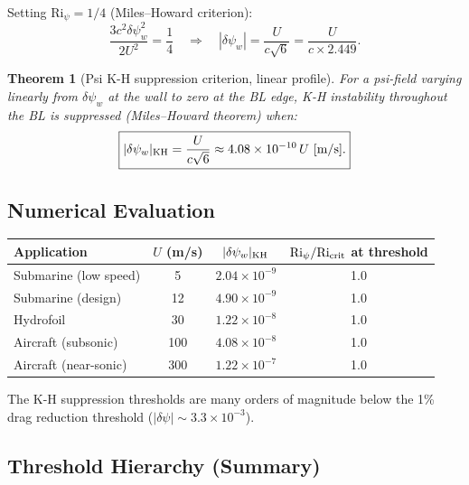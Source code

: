\documentclass[11pt,twocolumn]{article}
\newcommand{\dpsi}{\delta\psi}
\newcommand{\Ri}{\mathrm{Ri}}
\newtheorem{theorem}{Theorem}
\begin{document}
Setting $\Ri_\psi = 1/4$ (Miles--Howard criterion):
\begin{equation}
\frac{3c^2\dpsi_w^2}{2U^2} = \frac{1}{4}
\quad\Rightarrow\quad
|\dpsi_w| = \frac{U}{c\sqrt{6}} = \frac{U}{c\times 2.449}.
\label{eq:KH_threshold}
\end{equation}

\begin{theorem}[Psi K-H suppression criterion, linear profile]
\label{thm:KH}
For a psi-field varying linearly from $\dpsi_w$ at the wall to zero at the
BL edge, K-H instability throughout the BL is suppressed (Miles--Howard
theorem) when:
\begin{equation}
\boxed{
|\dpsi_w|_{\rm KH} = \frac{U}{c\sqrt{6}} \approx 4.08\times10^{-10}\,U~[\text{m/s}].
}
\label{eq:KH_boxed}
\end{equation}
\end{theorem}

\subsection{Numerical Evaluation}

\begin{center}
\begin{tabular}{@{}lccc@{}}
\toprule
\textbf{Application} & $U$ (m/s) & $|\dpsi_w|_{\rm KH}$ & $\Ri_\psi/\Ri_{\rm crit}$ at threshold \\
\midrule
Submarine (low speed) & 5 & $2.04\times10^{-9}$ & 1.0 \\
Submarine (design) & 12 & $4.90\times10^{-9}$ & 1.0 \\
Hydrofoil & 30 & $1.22\times10^{-8}$ & 1.0 \\
Aircraft (subsonic) & 100 & $4.08\times10^{-8}$ & 1.0 \\
Aircraft (near-sonic) & 300 & $1.22\times10^{-7}$ & 1.0 \\
\bottomrule
\end{tabular}
\end{center}

The K-H suppression thresholds are many orders of magnitude below the 1\%
drag reduction threshold ($|\dpsi| \sim 3.3\times10^{-3}$).

\subsection{Threshold Hierarchy (Summary)}
\end{document}
